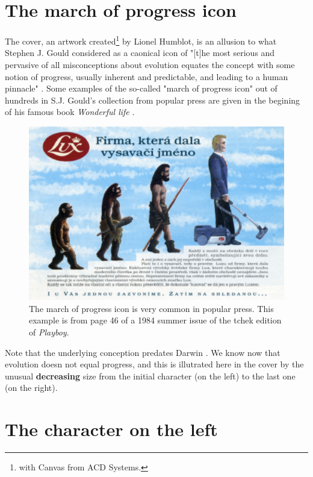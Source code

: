 \documentclass[a4paper]{article}
\begin{document}
\section*{The march of progress icon}

The cover, an artwork created\footnote{
with Canvas from  ACD Systems.}
by Lionel Humblot, is an allusion to what
Stephen J. Gould considered as a caonical icon of "[t]he most serious 
and pervasive of all misconceptions about evolution equates the 
concept with some notion of progress, usually inherent and predictable, 
and leading to a human pinnacle" \cite{GouldSJ1995}. Some examples
of the so-called "march of progress icon" out of hundreds in S.J. 
Gould's collection from popular press are given in the begining of his 
famous book \textit{Wonderful life} \cite{GouldSJ1989}.

\begin{figure}
\includegraphics[width=\textwidth]{../figs/mop}
\caption{The march of progress icon is very common in popular press. This
example is from page 46 of a 1984 summer issue of the tchek edition 
of \textit{Playboy}.}
\label{mop}
\end{figure}

Note that the underlying conception predates Darwin \cite{LovejoyAO1936}.
We know now that evolution doesn not equal progress, and this is illutrated
here in the cover by the unusual \textbf{decreasing} size from the initial 
character (on the left) to the last one (on the right).

\section*{The character on the left}
\end{document}
